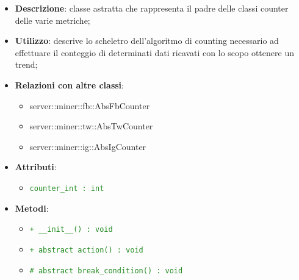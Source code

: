 			\begin{itemize}
				\item \textbf{Descrizione}: classe astratta che rappresenta il padre delle classi counter delle varie metriche;
				\item \textbf{Utilizzo}: descrive lo scheletro dell'algoritmo di counting necessario ad effettuare il conteggio di determinati dati ricavati con lo scopo ottenere un trend;
				\item \textbf{Relazioni con altre classi}:
					\begin{itemize}
						\item server::miner::fb::AbsFbCounter
						\item server::miner::tw::AbsTwCounter
						\item server::miner::ig::AbsIgCounter
					\end{itemize}
				\item \textbf{Attributi}: 
					\begin{itemize}
						\item \textcolor{forestgreen}{\texttt{counter\_int : int}}
					\end{itemize}
				\item \textbf{Metodi}:   
					\begin{itemize}
						\item \textcolor{forestgreen}{\texttt{+ \_\_init\_\_() : void}}
						\item \textcolor{forestgreen}{\texttt{+ abstract action() : void}}
						\item \textcolor{forestgreen}{\texttt{\# abstract break\_condition() : void}}
						\begin{description}

\end{description}
\end{itemize}
\end{itemize}
